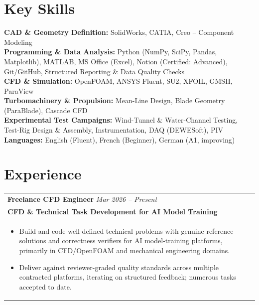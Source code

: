 \documentclass[a4paper,8pt]{article}
\begin{document}
\section{Key Skills}
\color[HTML]{371e77}\textbf{CAD \& Geometry Definition:} \color[HTML]{000000}SolidWorks, CATIA, Creo -- Component Modeling
\normalcolor\\
\color[HTML]{371e77}\textbf{Programming \& Data Analysis:} \color[HTML]{000000}Python (NumPy, SciPy, Pandas, Matplotlib), MATLAB, MS Office (Excel), Notion (Certified: Advanced), Git/GitHub, Structured Reporting \& Data Quality Checks
\normalcolor\\
\color[HTML]{371e77}\textbf{CFD \& Simulation:} \color[HTML]{000000}OpenFOAM, ANSYS Fluent, SU2, XFOIL, GMSH, ParaView
\normalcolor\\
\color[HTML]{371e77}\textbf{Turbomachinery \& Propulsion:} \color[HTML]{000000}Mean-Line Design, Blade Geometry (ParaBlade), Cascade CFD
\normalcolor\\
\color[HTML]{371e77}\textbf{Experimental Test Campaigns:} \color[HTML]{000000}Wind-Tunnel \& Water-Channel Testing, Test-Rig Design \& Assembly, Instrumentation, DAQ (DEWESoft), PIV
\normalcolor\\
\color[HTML]{371e77}\textbf{Languages:} \color[HTML]{000000}English (Fluent), French (Beginner), German (A1, improving)
\normalcolor

\section{Experience}
\begin{tabularx}{\linewidth}{ @{}l r@{} }
\textbf{Freelance CFD Engineer} \hfill \color[HTML]{371e77} \textit{Mar 2026 -- Present} \\[1pt]
\color[HTML]{371e77}\textbf{CFD \& Technical Task Development for AI Model Training}\ \hfill \color[HTML]{4B28A4} \\[1pt]
\begin{minipage}[t]{\linewidth}
    \begin{itemize}[nosep,after=\strut, leftmargin=*, itemsep=1pt]
        \item Build and code well-defined technical problems with genuine reference solutions and correctness verifiers for AI model-training platforms, primarily in CFD/OpenFOAM and mechanical engineering domains.
        \item Deliver against reviewer-graded quality standards across multiple contracted platforms, iterating on structured feedback; numerous tasks accepted to date.
    \end{itemize}
\end{minipage}
\end{tabularx}
\end{document}
